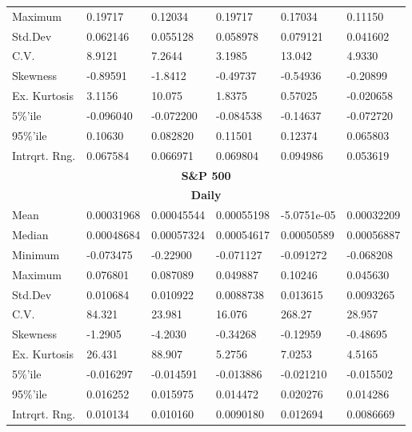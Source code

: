 \documentclass[11pt, english]{article}
\begin{document}
\begin{center}
\begin{longtable}{p{2cm}p{2cm}p{2cm}p{2cm}p{2cm}p{2cm} }
                Maximum & 0.19717 & 0.12034 & 0.19717 & 0.17034 & 0.11150\\
                Std.Dev & 0.062146 & 0.055128 & 0.058978 & 0.079121 & 0.041602\\
                C.V. & 8.9121 & 7.2644 & 3.1985 & 13.042 & 4.9330\\
                Skewness & -0.89591 & -1.8412 & -0.49737 & -0.54936 & -0.20899\\
                Ex. Kurtosis & 3.1156 & 10.075 & 1.8375 & 0.57025 & -0.020658\\
                5\%’ile & -0.096040 & -0.072200 & -0.084538 & -0.14637 & -0.072720\\
                95\%’ile & 0.10630 & 0.082820 & 0.11501 & 0.12374 & 0.065803\\
                Intrqrt. Rng. & 0.067584 & 0.066971 & 0.069804 & 0.094986 & 0.053619\\
		\hline
                \hline
		\multicolumn{6}{c}{\textbf{S\&P 500}}\\
                \hline
                \hline              
                \multicolumn{6}{c}{\textbf{Daily}}\\
                \hline
                Mean & 0.00031968 & 0.00045544 & 0.00055198 & -5.0751e-05 & 0.00032209\\
                Median & 0.00048684 & 0.00057324 & 0.00054617 & 0.00050589 & 0.00056887\\
                Minimum & -0.073475 & -0.22900 & -0.071127 & -0.091272 & -0.068208\\
                Maximum & 0.076801 & 0.087089 & 0.049887 & 0.10246 & 0.045630\\
                Std.Dev & 0.010684 & 0.010922 & 0.0088738 & 0.013615 & 0.0093265\\
                C.V. & 84.321 & 23.981 & 16.076 & 268.27 & 28.957\\
                Skewness & -1.2905 & -4.2030 & -0.34268 & -0.12959 & -0.48695\\
                Ex. Kurtosis & 26.431 & 88.907 & 5.2756 & 7.0253 & 4.5165\\
                5\%’ile & -0.016297 & -0.014591 & -0.013886 & -0.021210 & -0.015502\\
                95\%’ile & 0.016252 & 0.015975 & 0.014472 & 0.020276 & 0.014286\\
                Intrqrt. Rng. & 0.010134 & 0.010160 & 0.0090180 & 0.012694 & 0.0086669\\
                \hline

\end{longtable}
\end{center}
\end{document}
